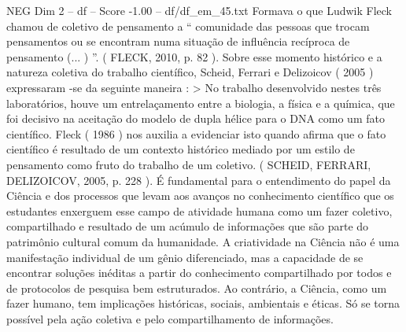 \begin{textsample}{NEG Dim 2 – df – Score -1.00 – df/df\_em\_45.txt}
Formava o que Ludwik Fleck chamou de coletivo de pensamento a “ comunidade das pessoas que trocam pensamentos ou se encontram numa situação de influência recíproca de pensamento (... ) ”. ( FLECK, 2010, p. 82 ).
Sobre esse momento histórico e a natureza coletiva do trabalho científico, Scheid, Ferrari e Delizoicov ( 2005 ) expressaram -se da seguinte maneira : > No trabalho desenvolvido nestes três laboratórios, houve um entrelaçamento entre a biologia, a física e a química, que foi decisivo na aceitação do modelo de dupla hélice para o DNA como um fato científico.
Fleck ( 1986 ) nos auxilia a evidenciar isto quando afirma que o fato científico é resultado de um contexto histórico mediado por um estilo de pensamento como fruto do trabalho de um coletivo. ( SCHEID, FERRARI, DELIZOICOV, 2005, p. 228 ).
É fundamental para o entendimento do papel da Ciência e dos processos que levam aos avanços no conhecimento científico que os estudantes enxerguem esse campo de atividade humana como um fazer coletivo, compartilhado e resultado de um acúmulo de informações que são parte do patrimônio cultural comum da humanidade.
A criatividade na Ciência não é uma manifestação individual de um gênio diferenciado, mas a capacidade de se encontrar soluções inéditas a partir do conhecimento compartilhado por todos e de protocolos de pesquisa bem estruturados.
Ao contrário, a Ciência, como um fazer humano, tem implicações históricas, sociais, ambientais e éticas.
Só se torna possível pela ação coletiva e pelo compartilhamento de informações.

\end{textsample}
